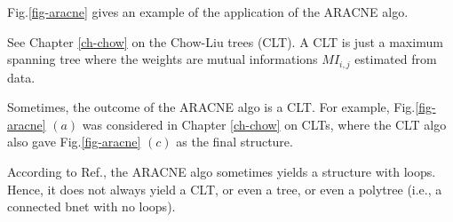 Fig.\ref{fig-aracne}
gives an example 
of the application
of the ARACNE algo.

See Chapter \ref{ch-chow} on 
the Chow-Liu trees (CLT).
A CLT is just
a  maximum spanning tree
where the weights are 
mutual informations 
 $MI_{i,j}$
estimated from data.

Sometimes, the outcome
of the ARACNE algo is a CLT.
For example,
Fig.\ref{fig-aracne}
$(a)$
was considered
in Chapter \ref{ch-chow}
on CLTs, where
the CLT algo
also
gave 
Fig.\ref{fig-aracne}
$(c)$ as the final structure.

According to Ref.\cite{aracne}, the 
 ARACNE algo sometimes 
yields a structure with loops.
Hence, it does not always yield a CLT,
or even a tree, or even a polytree (i.e., 
a connected bnet with no loops).


